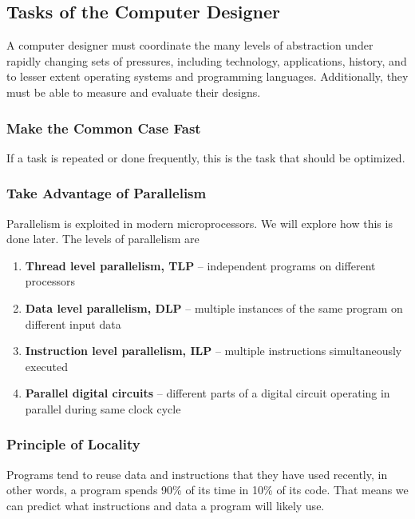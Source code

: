 \documentclass{article}
\begin{document}
\subsection{Tasks of the Computer Designer}

A computer designer must coordinate the many levels of abstraction under rapidly changing sets of pressures, including technology, applications, history, and to lesser extent operating systems and programming languages. Additionally, they must be able to measure and evaluate their designs.

\subsubsection{Make the Common Case Fast}

If a task is repeated or done frequently, this is the task that should be optimized. 

\subsubsection{Take Advantage of Parallelism}

Parallelism is exploited in modern microprocessors. We will explore how this is done later. The levels of parallelism are

\begin{enumerate}
\item \textbf{Thread level parallelism, TLP} -- independent programs on different processors

\item \textbf{Data level parallelism, DLP} -- multiple instances of the same program on different input data

\item \textbf{Instruction level parallelism, ILP} -- multiple instructions simultaneously executed

\item \textbf{Parallel digital circuits} -- different parts of a digital circuit operating in parallel during same clock cycle
\end{enumerate}

\subsubsection{Principle of Locality}

Programs tend to reuse data and instructions that they have used recently, in other words, a program spends 90\% of its time in 10\% of its code. That means we can predict what instructions and data a program will likely use.
\end{document}
